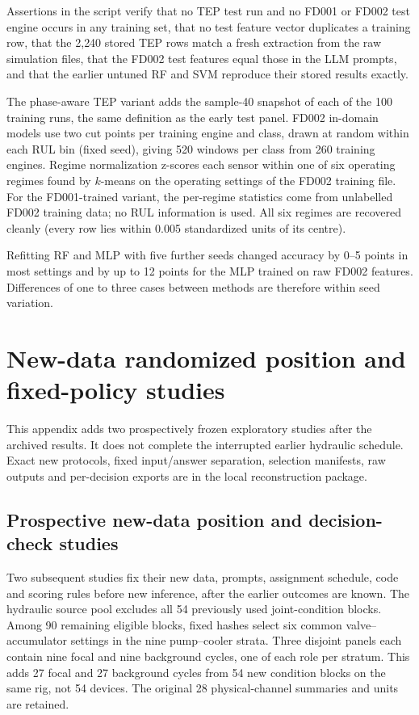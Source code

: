 \documentclass[11pt,a4paper]{article}
\begin{document}
Assertions in the script verify that no TEP test run and no FD001 or FD002 test engine occurs in any training set, that no test feature vector duplicates a training row, that the 2{,}240 stored TEP rows match a fresh extraction from the raw simulation files, that the FD002 test features equal those in the LLM prompts, and that the earlier untuned RF and SVM reproduce their stored results exactly.

The phase-aware TEP variant adds the sample-40 snapshot of each of the 100 training runs, the same definition as the early test panel. FD002 in-domain models use two cut points per training engine and class, drawn at random within each RUL bin (fixed seed), giving 520 windows per class from 260 training engines. Regime normalization z-scores each sensor within one of six operating regimes found by $k$-means on the operating settings of the FD002 training file. For the FD001-trained variant, the per-regime statistics come from unlabelled FD002 training data; no RUL information is used. All six regimes are recovered cleanly (every row lies within 0.005 standardized units of its centre).

Refitting RF and MLP with five further seeds changed accuracy by 0--5 points in most settings and by up to 12 points for the MLP trained on raw FD002 features. Differences of one to three cases between methods are therefore within seed variation.


\FloatBarrier


\clearpage\section{New-data randomized position and fixed-policy studies}

\label{sec:policy_supp}

This appendix adds two prospectively frozen exploratory studies after the archived results. It does not complete the interrupted earlier hydraulic schedule. Exact new protocols, fixed input/answer separation, selection manifests, raw outputs and per-decision exports are in the local reconstruction package.

\subsection{Prospective new-data position and decision-check studies}
Two subsequent studies fix their new data, prompts, assignment schedule, code and scoring rules before new inference, after the earlier outcomes are known. The hydraulic source pool excludes all 54 previously used joint-condition blocks. Among 90 remaining eligible blocks, fixed hashes select six common valve--accumulator settings in the nine pump--cooler strata. Three disjoint panels each contain nine focal and nine background cycles, one of each role per stratum. This adds 27 focal and 27 background cycles from 54 new condition blocks on the same rig, not 54 devices. The original 28 physical-channel summaries and units are retained.
\end{document}
